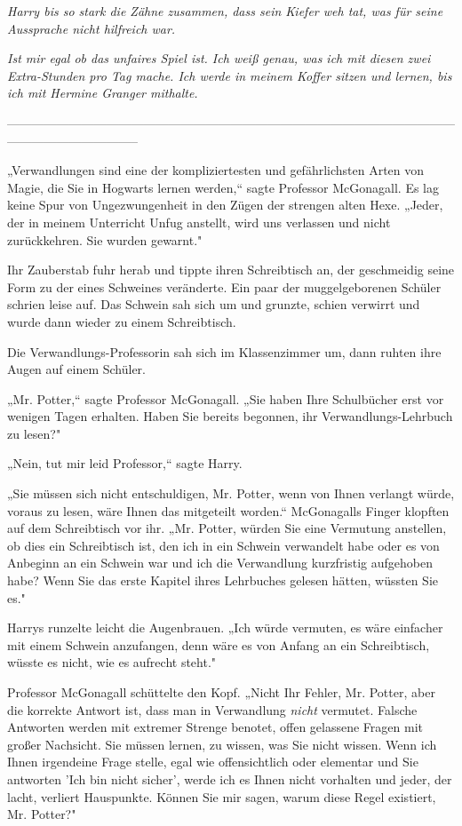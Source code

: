 {\emph{Harry bis so stark die Zähne zusammen, dass sein Kiefer weh tat, was für seine Aussprache nicht hilfreich war.}

\emph{\emph{Ist mir egal ob das unfaires Spiel ist. Ich weiß genau, was ich mit diesen zwei Extra-Stunden pro Tag mache. Ich werde in meinem Koffer sitzen und lernen, bis ich mit Hermine Granger mithalte.}}

--------------------------------------------------------------------------------------------------------------------------------------------

\hfill\break „Verwandlungen sind eine der kompliziertesten und gefährlichsten Arten von Magie, die Sie in Hogwarts lernen werden,“ sagte Professor McGonagall. Es lag keine Spur von Ungezwungenheit in den Zügen der strengen alten Hexe. „Jeder, der in meinem Unterricht Unfug anstellt, wird uns verlassen und nicht zurückkehren. Sie wurden gewarnt."

Ihr Zauberstab fuhr herab und tippte ihren Schreibtisch an, der geschmeidig seine Form zu der eines Schweines veränderte. Ein paar der muggelgeborenen Schüler schrien leise auf. Das Schwein sah sich um und grunzte, schien verwirrt und wurde dann wieder zu einem Schreibtisch.

Die Verwandlungs-Professorin sah sich im Klassenzimmer um, dann ruhten ihre Augen auf einem Schüler.

„Mr. Potter,“ sagte Professor McGonagall. „Sie haben Ihre Schulbücher erst vor wenigen Tagen erhalten. Haben Sie bereits begonnen, ihr Verwandlungs-Lehrbuch zu lesen?"

„Nein, tut mir leid Professor,“ sagte Harry.

„Sie müssen sich nicht entschuldigen, Mr. Potter, wenn von Ihnen verlangt würde, voraus zu lesen, wäre Ihnen das mitgeteilt worden.“ McGonagalls Finger klopften auf dem Schreibtisch vor ihr. „Mr. Potter, würden Sie eine Vermutung anstellen, ob dies ein Schreibtisch ist, den ich in ein Schwein verwandelt habe oder es von Anbeginn an ein Schwein war und ich die Verwandlung kurzfristig aufgehoben habe? Wenn Sie das erste Kapitel ihres Lehrbuches gelesen hätten, wüssten Sie es."

Harrys runzelte leicht die Augenbrauen. „Ich würde vermuten, es wäre einfacher mit einem Schwein anzufangen, denn wäre es von Anfang an ein Schreibtisch, wüsste es nicht, wie es aufrecht steht."

Professor McGonagall schüttelte den Kopf. „Nicht Ihr Fehler, Mr. Potter, aber die korrekte Antwort ist, dass man in Verwandlung \emph{nicht} vermutet. Falsche Antworten werden mit extremer Strenge benotet, offen gelassene Fragen mit großer Nachsicht. Sie müssen lernen, zu wissen, was Sie nicht wissen. Wenn ich Ihnen irgendeine Frage stelle, egal wie offensichtlich oder elementar und Sie antworten 'Ich bin nicht sicher', werde ich es Ihnen nicht vorhalten und jeder, der lacht, verliert Hauspunkte. Können Sie mir sagen, warum diese Regel existiert, Mr. Potter?"

}
